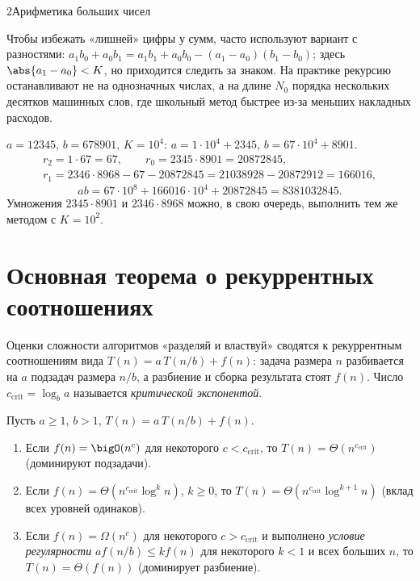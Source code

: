 \begin{lecture}{2}{Арифметика больших чисел}
\begin{remark}
Чтобы избежать «лишней» цифры у сумм, часто используют вариант с разностями:
$a_1 b_0 + a_0 b_1 = a_1 b_1 + a_0 b_0 - (a_1 - a_0)(b_1 - b_0)$; здесь $\abs{a_1 - a_0} < K$,
но приходится следить за знаком. На практике рекурсию останавливают не на однозначных числах,
а на длине $N_0$ порядка нескольких десятков машинных слов, где школьный метод быстрее
из-за меньших накладных расходов.
\end{remark}

\begin{example}\label{l2:karatsuba-hand}
$a = 12345$, $b = 678901$, $K = 10^4$: $a = 1 \cdot 10^4 + 2345$, $b = 67 \cdot 10^4 + 8901$.
\[
\begin{gathered}
  r_2 = 1 \cdot 67 = 67, \qquad r_0 = 2345 \cdot 8901 = 20872845,\\
  r_1 = 2346 \cdot 8968 - 67 - 20872845 = 21038928 - 20872912 = 166016,
\end{gathered}
\]
\[
  ab = 67 \cdot 10^8 + 166016 \cdot 10^4 + 20872845 = 8381032845.
\]
Умножения $2345 \cdot 8901$ и $2346 \cdot 8968$ можно, в свою очередь, выполнить тем же методом
с $K = 10^2$.
\end{example}



\section{Основная теорема о рекуррентных соотношениях}

Оценки сложности алгоритмов «разделяй и властвуй» сводятся к рекуррентным соотношениям вида
$T(n) = a\,T(n/b) + f(n)$: задача размера $n$ разбивается на $a$ подзадач размера $n/b$, а
разбиение и сборка результата стоят $f(n)$. Число $c_{\mathrm{crit}} = \log_b a$ называется
\emph{критической экспонентой}.

\begin{theorem}\label{l2:master}
Пусть $a \ge 1$, $b > 1$, $T(n) = a\,T(n/b) + f(n)$.
\begin{enumerate}
  \item Если $f(n) = \bigO(n^c)$ для некоторого $c < c_{\mathrm{crit}}$, то
    $T(n) = \Theta(n^{c_{\mathrm{crit}}})$ (доминируют подзадачи).
  \item Если $f(n) = \Theta(n^{c_{\mathrm{crit}}} \log^k n)$, $k \ge 0$, то
    $T(n) = \Theta(n^{c_{\mathrm{crit}}} \log^{k+1} n)$ (вклад всех уровней одинаков).
  \item Если $f(n) = \Omega(n^c)$ для некоторого $c > c_{\mathrm{crit}}$ и выполнено
    \emph{условие регулярности} $a f(n/b) \le k f(n)$ для некоторого $k < 1$ и всех больших $n$,
    то $T(n) = \Theta(f(n))$ (доминирует разбиение).
\end{enumerate}
\end{theorem}


\end{lecture}
